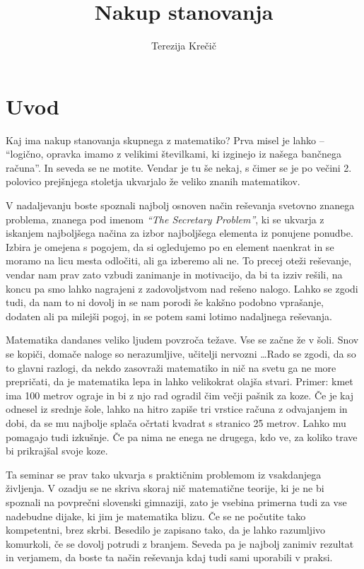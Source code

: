 \documentclass[a4paper, 12pt, titlepage]{article}
\author{Terezija Krečič}
\title{Nakup stanovanja}
\begin{document}
\maketitle
\tableofcontents
\newpage

\section{Uvod}

Kaj ima nakup stanovanja skupnega z matematiko? Prva misel je lahko -- ``logično, opravka imamo z velikimi številkami, ki izginejo iz našega bančnega računa''. In seveda se ne motite. Vendar je tu še nekaj, s čimer se je po večini 2. polovico prejšnjega stoletja ukvarjalo že veliko znanih matematikov.

V nadaljevanju boste spoznali najbolj osnoven način reševanja svetovno znanega problema, znanega pod imenom \emph{``The Secretary Problem''}, ki se ukvarja z iskanjem najboljšega načina za izbor najboljšega elementa iz ponujene ponudbe. Izbira je omejena s pogojem, da si ogledujemo po en element naenkrat in se moramo na licu mesta odločiti, ali ga izberemo ali ne. To precej oteži reševanje, vendar nam prav zato vzbudi zanimanje in motivacijo, da bi ta izziv rešili, na koncu pa smo lahko nagrajeni z zadovoljstvom nad rešeno nalogo. Lahko se zgodi tudi, da nam to ni dovolj in se nam porodi še kakšno podobno vprašanje, dodaten ali pa milejši pogoj, in se potem sami lotimo nadaljnega reševanja.

Matematika dandanes veliko ljudem povzroča težave. Vse se začne že v šoli. Snov se kopiči, domače naloge so nerazumljive, učitelji nervozni \ldots Rado se zgodi, da so to glavni razlogi, da nekdo zasovraži matematiko in nič na svetu ga ne more prepričati, da je matematika lepa in lahko velikokrat olajša stvari. Primer: kmet ima 100 metrov ograje in bi z njo rad ogradil čim večji pašnik za koze. Če je kaj odnesel iz srednje šole, lahko na hitro zapiše tri vrstice računa z odvajanjem in dobi, da se mu najbolje splača očrtati kvadrat s stranico 25 metrov. Lahko mu pomagajo tudi izkušnje. Če pa nima ne enega ne drugega, kdo ve, za koliko trave bi prikrajšal svoje koze.

Ta seminar se prav tako ukvarja s praktičnim problemom iz vsakdanjega življenja. V ozadju se ne skriva skoraj nič matematične teorije, ki je ne bi spoznali na povprečni slovenski gimnaziji, zato je vsebina primerna tudi za vse nadebudne dijake, ki jim je matematika blizu. Če se ne počutite tako kompetentni, brez skrbi. Besedilo je zapisano tako, da je lahko razumljivo komurkoli, če se dovolj potrudi z branjem. Seveda pa je najbolj zanimiv rezultat in verjamem, da boste ta način reševanja kdaj tudi sami uporabili v praksi.
\end{document}
